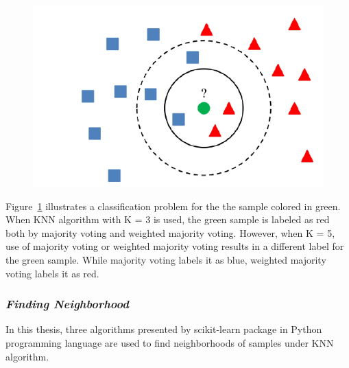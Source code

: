 \begin{figure}[h]
	\centering
	\includegraphics[width=.6\linewidth]{fig/knn_example.png}
	\vspace*{2mm}
	\label{fig:knn_example}
\end{figure}

Figure~\ref{fig:knn_example} illustrates a classification problem for the the sample colored in green. When KNN algorithm with K = 3 is used, the green sample is labeled as red both by majority voting and weighted majority voting. However, when K = 5, use of majority voting or weighted majority voting results in a different label for the green sample. While majority voting labels it as blue,
weighted majority voting labels it as red.

\subsubsection*{\textit{Finding Neighborhood}}

In this thesis, three algorithms presented by scikit-learn
package \cite{scikit-learn} in Python programming language are used to find neighborhoods of samples under KNN algorithm.


